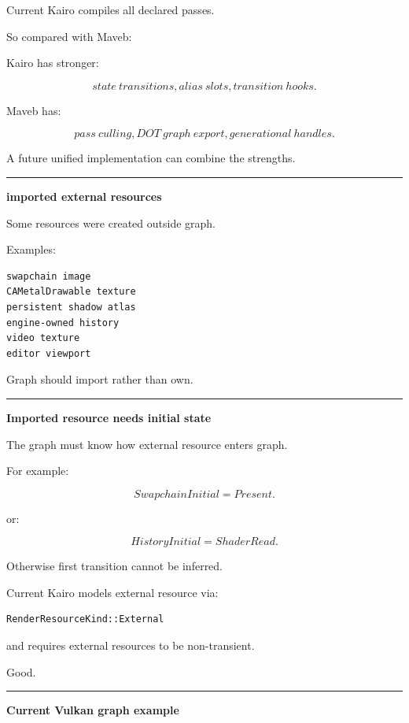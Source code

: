 Current Kairo compiles all declared passes.

So compared with Maveb:

Kairo has stronger:

\[
state\ transitions,
alias\ slots,
transition\ hooks.
\]

Maveb has:

\[
pass\ culling,
DOT\ graph\ export,
generational\ handles.
\]

A future unified implementation can combine the strengths.

\begin{center}\rule{0.5\linewidth}{0.5pt}\end{center}

\textbf{imported external resources}

Some resources were created outside graph.

Examples:

\begin{verbatim}
swapchain image
CAMetalDrawable texture
persistent shadow atlas
engine-owned history
video texture
editor viewport
\end{verbatim}

Graph should import rather than own.

\begin{center}\rule{0.5\linewidth}{0.5pt}\end{center}

\textbf{Imported resource needs initial state}

The graph must know how external resource enters graph.

For example:

\[
SwapchainInitial=Present.
\]

or:

\[
HistoryInitial=ShaderRead.
\]

Otherwise first transition cannot be inferred.

Current Kairo models external resource via:

\begin{verbatim}
RenderResourceKind::External
\end{verbatim}

and requires external resources to be non-transient.

Good.

\begin{center}\rule{0.5\linewidth}{0.5pt}\end{center}

\textbf{Current Vulkan graph example}

